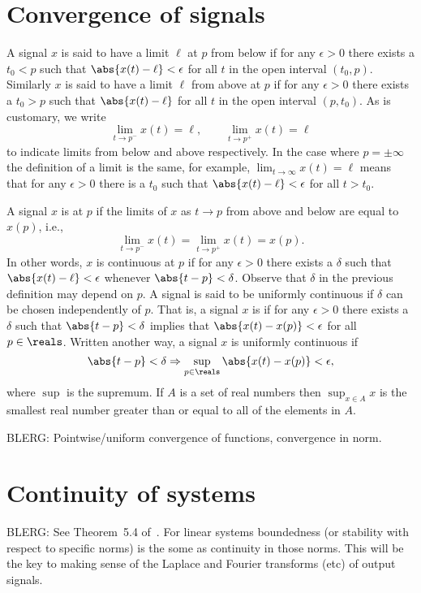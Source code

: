 \begin{advanced}

\section{Convergence of signals}

A signal $x$ is said to have a limit $\ell$ at $p$ from below if for any $\epsilon > 0$ there exists a $t_0 <  p$ such that $\abs{x(t) - \ell} < \epsilon$ for all $t$ in the open interval $(t_0, p)$.  Similarly $x$ is said to have a limit $\ell$ from above at $p$ if for any $\epsilon > 0$ there exists a $t_0 > p$ such that $\abs{x(t) - \ell}$ for all $t$ in the open interval $(p, t_0)$.  As is customary, we write
\[
\lim_{t \to p^-} x(t) = \ell, \qquad \lim_{t \to p^+} x(t) = \ell
\]
to indicate limits from below and above respectively.  In the case where $p = \pm \infty$ the definition of a limit is the same, for example, $\lim_{t \rightarrow \infty} x(t) = \ell$ means that for any $\epsilon > 0$ there is a $t_0$ such that $\abs{x(t) - \ell} < \epsilon$ for all $t > t_0$.

A signal $x$ is  at $p$ if the limits of $x$ as $t \rightarrow p$ from above and below are equal to $x(p)$, i.e.,
\[
\lim_{t \to p^-} x(t) = \lim_{t \to p^+} x(t) = x(p).
\]
In other words, $x$ is continuous at $p$ if for any $\epsilon > 0$ there exists a $\delta$ such that $\abs{x(t) - \ell} < \epsilon$ whenever $\abs{t - p} < \delta$.  Observe that $\delta$ in the previous definition may depend on $p$.  A signal is said to be uniformly continuous if $\delta$ can be chosen independently of $p$.  That is, a signal $x$ is  if for any $\epsilon > 0$ there exists a $\delta$ such that $\abs{t - p} < \delta$ implies that $\abs{x(t) - x(p)} < \epsilon$ for all $p \in \reals$.  Written another way, a signal $x$ is uniformly continuous if
\[
\abs{t - p} < \delta \Rightarrow \sup_{p \in \reals} \abs{x(t) - x(p)} < \epsilon,
\]
where $\sup$ is the supremum.  If $A$ is a set of real numbers then $\sup_{x \in A} x$ is the smallest real number greater than or equal to all of the elements in $A$. 

BLERG: Pointwise/uniform convergence of functions, convergence in norm.


\section{Continuity of systems}

BLERG: See Theorem~5.4 of~\cite{Rudin_real_and_complex_analysis}.  For linear systems boundedness (or stability with respect to specific norms) is the some as continuity in those norms.  This will be the key to making sense of the Laplace and Fourier transforms (etc) of output signals.

\end{advanced}


